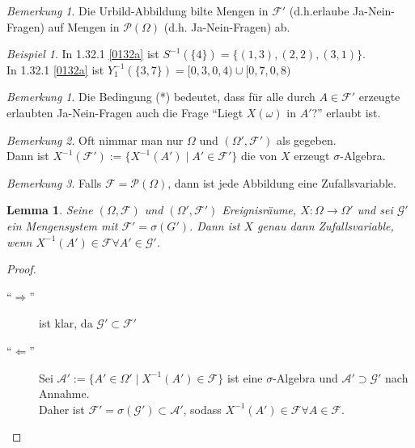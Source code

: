 \documentclass[10pt,a4paper]{article}
\newcommand{\Potset}{\mathscr P}
\newcommand{\scF}{\ensuremath{\mathscr{F}}}
\theoremstyle{plain}
\newtheorem{lem}[theorem]{Lemma}
\theoremstyle{definition}
\theoremstyle{remark}
\newtheorem{bem}[theorem]{Bemerkung}
\newtheorem*{bem*}{Bemerkung}
\newtheorem*{exm*}{Beispiel}
\begin{document}
	\begin{bem}
		Die Urbild-Abbildung bilte Mengen in $\scF'$ (d.h.erlaube Ja-Nein-Fragen) auf Mengen  in $\Potset(\Omega)$ (d.h. Ja-Nein-Fragen) ab.
	\end{bem}

	\begin{exm*}
		In 1.32.1 \ref{0132a} ist $S^{-1}(\{4\})=\{(1,3),(2,2),(3,1)\}$.\\
		In 1.32.1 \ref{0132a} ist $Y_1^{-1}(\{3,7\})=[0,3,0,4)\cup[0,7,0,8)$
	\end{exm*}

	\begin{bem*}
		Die Bedingung (*) bedeutet, dass für alle durch $A\in\scF'$ erzeugte erlaubten Ja-Nein-Fragen auch die Frage \enquote{Liegt $X(\omega)$ in $A'$?} erlaubt ist.
	\end{bem*}
	\begin{bem*}
		Oft nimmar  man nur $\Omega$ und $(\Omega',\scF')$ als gegeben.\\
		Dann ist $X^{-1}(\scF'):=\{X^{-1}(A')\mid A'\in \scF'\}$ die von $X$ erzeugt $\sigma$-Algebra.
	\end{bem*}
	\begin{bem*}
		Falls $\scF=\Potset(\Omega)$, dann ist jede Abbildung eine Zufallsvariable.
	\end{bem*}

	\begin{lem}\label{0135lem}
		Seine $(\Omega,\scF)$ und $(\Omega',\scF')$ Ereignisräume, $X:\Omega\to\Omega'$ und sei $\mathscr G'$ ein Mengensystem mit $\scF'=\sigma(G')$. Dann ist $X$ genau dann Zufallsvariable, wenn $X^{-1}(A')\in\scF\forall A'\in \mathscr G'$.
	\end{lem}
	\begin{proof}
		\begin{description}
			\item[\enquote{$\Rightarrow$}] ist klar, da $\mathscr G'\subset \scF'$
			\item[\enquote{$\Leftarrow$}] Sei $\mathscr A':=\{A'\in\Omega'\mid X^{-1}(A')\in\scF\}$ ist eine $\sigma$-Algebra und $\mathscr A'\supset\mathscr G'$ nach Annahme.\\
			Daher ist $\scF'=\sigma(\mathscr G')\subset\mathscr A'$, sodass $X^{-1}(A')\in\scF\forall A\in\scF$.
		\end{description}
	\end{proof}
\end{document}
